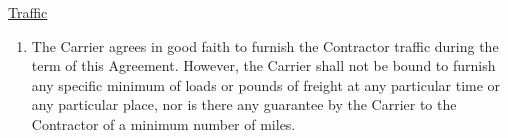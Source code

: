 \underline{Traffic}
\begin{enumerate}[
    ref = \SecondLevelEnumerator
]
    \item The Carrier agrees in good faith to furnish the Contractor
    traffic during the term of this Agreement. However, the Carrier shall
    not be bound to furnish any specific minimum of loads or pounds of
    freight at any particular time or any particular place, nor is there
    any guarantee by the Carrier to the Contractor of a minimum number of
    miles.
\end{enumerate}